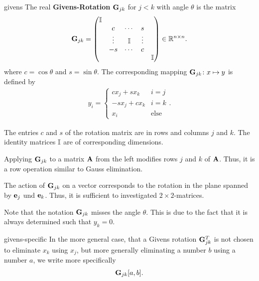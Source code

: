 \begin{Definition}{givens}
  The real \textbf{Givens-Rotation} $\mathbf G_{jk}$ for $j<k$ with angle $\theta$ is the matrix
  \begin{gather}
      \mathbf G_{jk} =
    \begin{pmatrix}
      \mathbb I \\
      &c&\cdots&s\\
      &\vdots&\mathbb I &\vdots\\
      &-s&\cdots&c\\
      &&&&\mathbb I
    \end{pmatrix}
    \in\mathbb R^{n\times n}.
  \end{gather}
    where $c = \cos\theta$ and $s = \sin\theta$.
  The corresponding mapping $\mathbf G_{jk}\colon x\mapsto y$ is defined by
  \begin{gather}
    y_i =
    \begin{cases}
      c x_j + s x_k & i=j\\
      -s x_j + c x_k & i=k\\
      x_i &\text{else}
    \end{cases}.
  \end{gather}
\end{Definition}

\begin{remark}
  The entries $c$ and $s$ of the rotation matrix are in rows and
  columns $j$ and $k$.  The identity matrices $\mathbb I$ are of
  corresponding dimensions.

  Applying $\mathbf G_{jk}$ to a matrix $\mathbf A$ from the left modifies rows  $j$ and $k$ of $\mathbf A$. Thus, it is a row operation similar to Gauss elimination.

  The action of $\mathbf G_{jk}$ on a vector corresponds to the rotation
  in the plane spanned by $\mathbf e_j$ und $\mathbf e_k$. Thus, it is sufficient to investigated $2\times2$-matrices.

  Note that the notation $\mathbf G_{jk}$ misses the angle $\theta$. This
  is due to the fact that it is always determined such that $y_k=0$.
\end{remark}

\begin{Notation}{givens-specific}
  In the more general case, that a Givens rotation $\mathbf G_{jk}^T$ is not chosen to eliminate $x_k$ using $x_j$, but more generally eliminating a number $b$ using a number $a$, we write more specifically
  \begin{gather}
    \mathbf G_{jk}[a,b].
  \end{gather}
\end{Notation}


